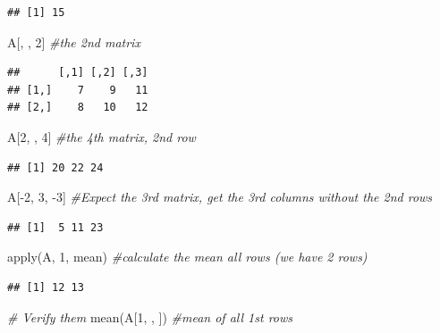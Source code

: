 \documentclass[
]{book}
\newenvironment{Shaded}{\begin{snugshade}}{\end{snugshade}}
\newcommand{\CommentTok}[1]{\textcolor[rgb]{0.56,0.35,0.01}{\textit{#1}}}
\newcommand{\DecValTok}[1]{\textcolor[rgb]{0.00,0.00,0.81}{#1}}
\newcommand{\FunctionTok}[1]{\textcolor[rgb]{0.00,0.00,0.00}{#1}}
\newcommand{\NormalTok}[1]{#1}
\newcommand{\SpecialCharTok}[1]{\textcolor[rgb]{0.00,0.00,0.00}{#1}}
\theoremstyle{definition}
\theoremstyle{definition}
\theoremstyle{definition}
\theoremstyle{definition}
\theoremstyle{remark}
\begin{document}
\begin{verbatim}
## [1] 15
\end{verbatim}

\begin{Shaded}
\begin{Highlighting}[]
\NormalTok{A[, , }\DecValTok{2}\NormalTok{]       }\CommentTok{\#the 2nd matrix}
\end{Highlighting}
\end{Shaded}

\begin{verbatim}
##      [,1] [,2] [,3]
## [1,]    7    9   11
## [2,]    8   10   12
\end{verbatim}

\begin{Shaded}
\begin{Highlighting}[]
\NormalTok{A[}\DecValTok{2}\NormalTok{, , }\DecValTok{4}\NormalTok{]      }\CommentTok{\#the 4th matrix, 2nd row}
\end{Highlighting}
\end{Shaded}

\begin{verbatim}
## [1] 20 22 24
\end{verbatim}

\begin{Shaded}
\begin{Highlighting}[]
\NormalTok{A[}\SpecialCharTok{{-}}\DecValTok{2}\NormalTok{, }\DecValTok{3}\NormalTok{, }\SpecialCharTok{{-}}\DecValTok{3}\NormalTok{]   }\CommentTok{\#Expect the 3rd matrix, get the 3rd columns without the 2nd rows}
\end{Highlighting}
\end{Shaded}

\begin{verbatim}
## [1]  5 11 23
\end{verbatim}

\begin{Shaded}
\begin{Highlighting}[]
\FunctionTok{apply}\NormalTok{(A, }\DecValTok{1}\NormalTok{, mean)      }\CommentTok{\#calculate the mean all rows (we have 2 rows)}
\end{Highlighting}
\end{Shaded}

\begin{verbatim}
## [1] 12 13
\end{verbatim}

\begin{Shaded}
\begin{Highlighting}[]
\CommentTok{\# Verify them}
\FunctionTok{mean}\NormalTok{(A[}\DecValTok{1}\NormalTok{, , ])         }\CommentTok{\#mean of all 1st rows}
\end{Highlighting}
\end{Shaded}
\end{document}
